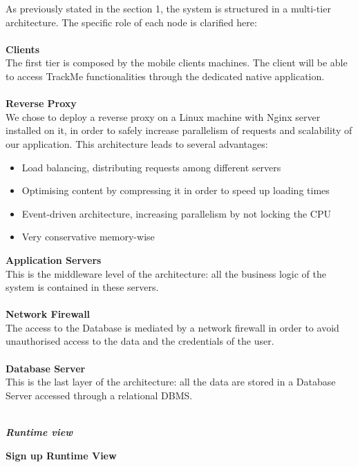 \begin{legal}
\begin{figure}[H]
		\end{figure}
		As previously stated in the section 1, the system is structured in a multi-tier architecture. The specific role of each node is clarified here:\\\\
		\textbf{Clients}\\
The first tier is composed by the mobile clients machines. The client will be able to access TrackMe functionalities through the dedicated native application.\\\\
		\textbf{Reverse Proxy}\\
We chose to deploy a reverse proxy on a Linux machine with Nginx server installed on it, in order to safely increase parallelism of requests and scalability
of our application. This architecture leads to several advantages:
		\begin{itemize}
			\item Load balancing, distributing requests among different servers
			\item Optimising content by compressing it in order to speed up loading times
			\item Event-driven architecture, increasing parallelism by not locking the CPU
			\item Very conservative memory-wise\\
		\end{itemize}
		\textbf{Application Servers}\\
This is the middleware level of the architecture: all the business logic of
the system is contained in these servers.\\\\
		\textbf{Network Firewall}\\
The access to the Database is mediated by a network firewall in order to
avoid unauthorised access to the data and the credentials of the user.\\\\
		\textbf{Database Server}\\
This is the last layer of the architecture: all the data are stored in a Database Server accessed through a relational DBMS. \\\\
		\item \textit{\textbf{Runtime view}}\\
			\begin{legal}
				\item \textbf{Sign up Runtime View}\\

\end{legal}
\end{legal}

